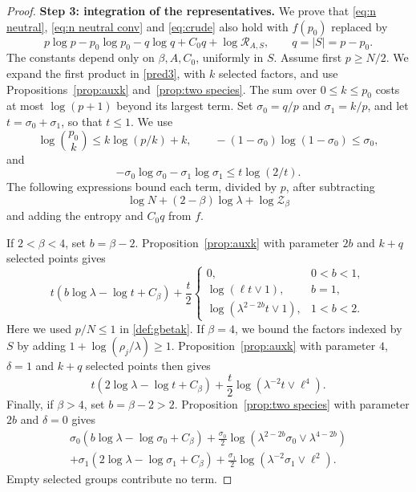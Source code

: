 \documentclass[a4paper,10pt,leqno]{amsart}
\numberwithin{equation}{section}
\def\mc{\mathcal}
\begin{document}
\begin{proof}
  \smallskip
  \noindent
  \textbf{Step 3: integration of the representatives.}
  We prove that \eqref{eq:n neutral}, \eqref{eq:n neutral conv} and \eqref{eq:crude} also hold with $f(p_0)$ replaced by
  \begin{equation}\label{eq:representative-bound}
    p\log p-p_0\log p_0-q\log q+C_0q+\log\mathcal R_{A,S},
    \qquad q=|S|=p-p_0.
  \end{equation}
  The constants depend only on $\beta,A,C_0$, uniformly in $S$. Assume first $p\ge N/2$. We expand the first product in \eqref{pred3}, with $k$ selected factors, and use Propositions~\ref{prop:auxk} and~\ref{prop:two species}. The sum over $0\le k\le p_0$ costs at most $\log(p+1)$ beyond its largest term.
  Set $\sigma_0=q/p$ and $\sigma_1=k/p$, and let $t=\sigma_0+\sigma_1$, so that $t\le1$. We use
  \[
    \log\binom{p_0}{k}\le k\log(p/k)+k,\qquad
    -(1-\sigma_0)\log(1-\sigma_0)\le \sigma_0,
  \]
  and
  \[
    -\sigma_0\log \sigma_0-\sigma_1\log \sigma_1\le t\log(2/t).
  \]
  The following expressions bound each term, divided by $p$, after subtracting
  \[
    \log N+(2-\beta)\log\lambda+\log\mc Z_\beta
  \]
  and adding the entropy and $C_0q$ from $f$.

  If $2<\beta<4$, set $b=\beta-2$. Proposition~\ref{prop:auxk} with parameter $2b$ and $k+q$ selected points gives
  \[
    t\left(b\log\lambda-\log t+C_\beta\right)
    +\frac{t}{2}\begin{cases}
      0,&0<b<1,\\
      \log(\ell t\vee1),&b=1,\\
      \log(\lambda^{2-2b}t\vee1),&1<b<2.
    \end{cases}
  \]
  Here we used $p/N\le1$ in \eqref{def:gbetak}.
  If $\beta=4$, we bound the factors indexed by $S$ by adding
  $1+\log(\rho_j/\lambda)\ge1$. Proposition~\ref{prop:auxk} with parameter $4$, $\delta=1$ and $k+q$ selected points then gives
  \[
    t\left(2\log\lambda-\log t+C_\beta\right)
    +\frac{t}{2}\log(\lambda^{-2}t\vee\ell^4).
  \]
  Finally, if $\beta>4$, set $b=\beta-2>2$. Proposition~\ref{prop:two species} with parameter $2b$ and $\delta=0$ gives
  \begin{multline*}
    \sigma_0\left(b\log\lambda-\log \sigma_0+C_\beta\right)
    +\frac{\sigma_0}{2}\log(\lambda^{2-2b}\sigma_0\vee\lambda^{4-2b})\\
    +\sigma_1\left(2\log\lambda-\log \sigma_1+C_\beta\right)
    +\frac{\sigma_1}{2}\log(\lambda^{-2}\sigma_1\vee\ell^2).
  \end{multline*}
  Empty selected groups contribute no term.


\end{proof}
\end{document}
